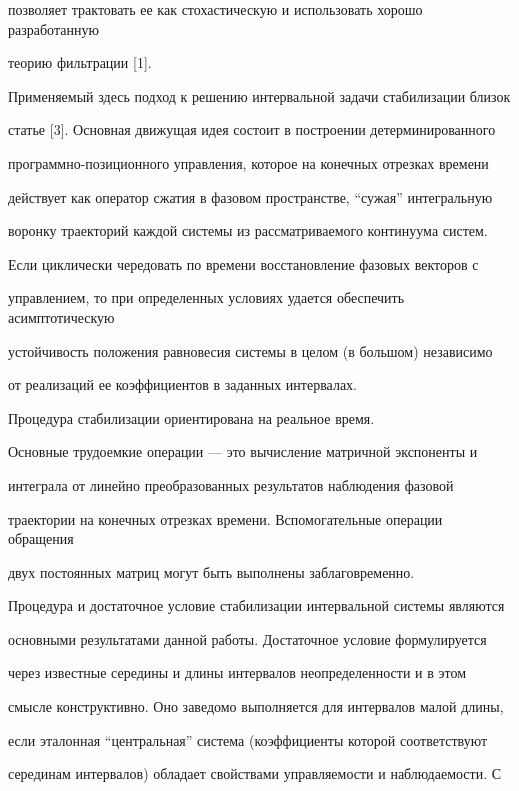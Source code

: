 позволяет трактовать ее как стохастическую и использовать хорошо разработанную


теорию фильтрации [1].





Применяемый здесь подход к решению интервальной задачи стабилизации близок


статье [3]. Основная движущая идея состоит в построении детерминированного


программно-позиционного управления, которое на конечных отрезках времени


действует как оператор сжатия в фазовом пространстве, ``сужая'' интегральную


воронку траекторий каждой системы из рассматриваемого континуума систем.


Если циклически чередовать по времени восстановление фазовых векторов с


управлением, то при определенных условиях удается обеспечить асимптотическую


устойчивость положения равновесия системы в целом (в большом) независимо


от реализаций ее коэффициентов в заданных интервалах.





Процедура стабилизации ориентирована на реальное время.


Основные трудоемкие операции --- это вычисление матричной экспоненты и


интеграла от линейно преобразованных результатов наблюдения фазовой


траектории на конечных отрезках времени. Вспомогательные операции обращения


двух постоянных матриц могут быть выполнены заблаговременно.





Процедура и достаточное условие стабилизации интервальной системы являются


основными результатами данной работы. Достаточное условие формулируется


через известные середины и длины интервалов неопределенности и в этом


смысле конструктивно. Оно заведомо выполняется для интервалов малой длины,


если эталонная ``центральная'' система (коэффициенты которой соответствуют


серединам интервалов) обладает свойствами управляемости и наблюдаемости. С


